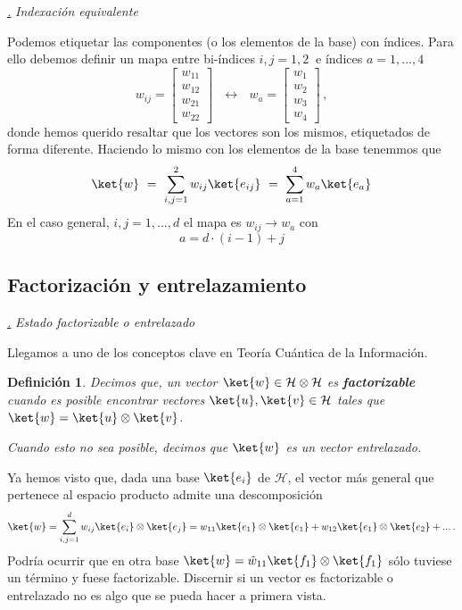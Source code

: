 \documentclass[a4paper,11pt]{book} %
\newtheorem{definicion_contador}{Definición}
\newcommand{\Definicion}[1]{
		\begin{mybox_gray2}{}
			\begin{definicion_contador}
				 #1 
			\end{definicion_contador} 
		\end{mybox_gray2}
	}
\numberwithin{equation}{chapter}
\def\subsubiContadorIt{\par\addtocounter{subsubsection}{1}\underline{\it\thesubsubsection.}\hskip0.5cm \setcounter{subsubsubsectionIt}{0}}
\newcommand{\SubsubiIt}[1]{
		\subsubiContadorIt \textit{#1}
	}
\newcounter{subsubsubsectionIt}[subsubsection]
\begin{document}
			\SubsubiIt{Indexación equivalente}

Podemos etiquetar las componentes (o los elementos de la base) con índices. Para ello debemos definir un mapa  entre bi-índices $i,j=1,2~$ e índices $a=1,...,4$
	\begin{equation}
	w_{ij} =\begin{bmatrix} w_{11} \\ w_{12} \\ w_{21} \\ w_{22} \end{bmatrix} ~~~\longleftrightarrow ~~~
w_a  = \begin{bmatrix} w_1 \\ w_2 \\ w_3 \\ w_4 \end{bmatrix} \, ,
	\end{equation}
donde hemos querido resaltar que los vectores son los mismos, etiquetados de forma diferente. Haciendo lo mismo con los elementos de la base tenemmos que
	\begin{equation}
	\ket{w} ~= ~ \sum_{i,j=1}^2 w_{ij} \ket{e_{ij}} ~=~ \sum_{a=1}^{4} w_{a} \ket{e_{a}}
	\end{equation}
En el caso general, $i,j=1,...,d$ el mapa es $w_{ij}  \to  w_a$ con
	\begin{equation}
	a = d \cdot (i-1) + j 
	\end{equation}


		\subsection{Factorización y entrelazamiento}



			\SubsubiIt{Estado factorizable o entrelazado}

Llegamos a uno de los conceptos clave en Teoría Cuántica de la Información. 
	\Definicion{
	Decimos que, un vector $\ket{w}\in \mathcal{H}\otimes\mathcal{H}$ es \textbf{factorizable} cuando es posible encontrar vectores $\ket{u},\ket{v}\in \mathcal{H}$ tales que $ \ket{w} = \ket{u}\otimes\ket{v}$.
\vspace{0.3cm}

Cuando esto no sea posible, decimos que  $\ket{w}$ es un vector entrelazado.
	}

Ya hemos visto que, dada una base $\ket{e_i}$ de $\mathcal{H}$, el vector más general que pertenece al espacio producto admite una descomposición 
$$
\ket{w} = \sum_{i,j=1}^d w_{ij}\ket{e_{i}}\otimes \ket{e_j} = w_{11}\ket{e_1}\otimes\ket{e_1} + w_{12}\ket{e_1}\otimes\ket{e_2} + ...\, .
$$
Podría ocurrir que en otra base $\ket{w} = \tilde w_{11} \ket{f_1}\otimes\ket{f_1}$ sólo tuviese un término y fuese factorizable. Discernir si un vector es factorizable o entrelazado no es algo que se pueda hacer a primera vista.
\end{document}
